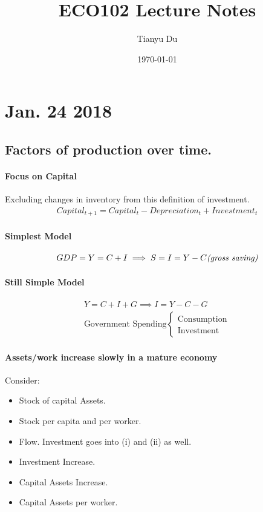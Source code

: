 \documentclass[11pt]{article}
\title{ECO102 Lecture Notes}
\author{Tianyu Du}
\date{\today}
\begin{document}
\maketitle	
	
	\section{Jan. 24 2018}
	\subsection{Factors of production over time.}
	\paragraph{Focus on Capital} Excluding changes in inventory from this definition of investment.
	\begin{align*}
		Capital_{t+1} = Capital_t - Depreciation_t + Investment_t
	\end{align*}
	\paragraph{Simplest Model}
	\begin{align*}
		GDP = Y = C + I \implies S = I = Y - C \emph{(gross saving)}
	\end{align*}
	
	\paragraph{Still Simple Model}
	\begin{align*}
		Y = C + I + G \implies I = Y - C - G \\
		\text{Government Spending}
		\begin{cases}
			\text{Consumption} \\
			\text{Investment}
		\end{cases}
	\end{align*}
	\paragraph{Assets/work increase slowly in a mature economy} \quad
	\newline Consider:
	\begin{itemize}
		\item Stock of capital Assets.
		\item Stock per capita and per worker.
		\item Flow. Investment goes into (i) and (ii) as well.
		\item Investment Increase.
		\item Capital Assets Increase.
		\item Capital Assets per worker.
	\end{itemize}
\end{document}
